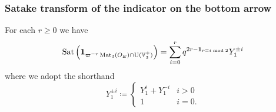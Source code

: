 \subsubsection{Satake transform of the indicator on the bottom arrow}
\begin{proposition}
  For each $r \ge 0$ we have
  \[ \operatorname{Sat}\left(\mathbf{1}_{\varpi^{-r} \operatorname{Mat}_3(O_E) \cap \operatorname{U}(\mathbb V_3^+)}\right)
    = \sum_{i=0}^r q^{2r - \mathbf{1}_{r \equiv i \bmod 2}} Y_1^{\pm i} \]
  where we adopt the shorthand
  \[
    Y_1^{\pm i} \coloneqq
    \begin{cases}
      Y_1^i + Y_1^{-i} & i > 0 \\
      1 & i = 0 .
    \end{cases}
  \]
\end{proposition}
